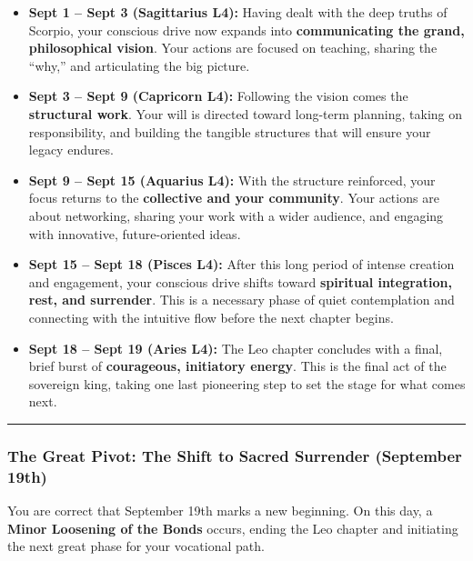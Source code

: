 \documentclass{article}
\begin{document}
\begin{itemize}
\item
  \textbf{Sept 1 -- Sept 3 (Sagittarius L4):} Having dealt with the deep truths of Scorpio, your conscious drive now expands into \textbf{communicating the grand, philosophical vision}. Your actions are focused on teaching, sharing the ``why,'' and articulating the big picture.
\item
  \textbf{Sept 3 -- Sept 9 (Capricorn L4):} Following the vision comes the \textbf{structural work}. Your will is directed toward long-term planning, taking on responsibility, and building the tangible structures that will ensure your legacy endures.
\item
  \textbf{Sept 9 -- Sept 15 (Aquarius L4):} With the structure reinforced, your focus returns to the \textbf{collective and your community}. Your actions are about networking, sharing your work with a wider audience, and engaging with innovative, future-oriented ideas.
\item
  \textbf{Sept 15 -- Sept 18 (Pisces L4):} After this long period of intense creation and engagement, your conscious drive shifts toward \textbf{spiritual integration, rest, and surrender}. This is a necessary phase of quiet contemplation and connecting with the intuitive flow before the next chapter begins.
\item
  \textbf{Sept 18 -- Sept 19 (Aries L4):} The Leo chapter concludes with a final, brief burst of \textbf{courageous, initiatory energy}. This is the final act of the sovereign king, taking one last pioneering step to set the stage for what comes next.
\end{itemize}

\begin{center}\rule{0.5\linewidth}{0.5pt}\end{center}

\subsubsection*{The Great Pivot: The Shift to Sacred Surrender (September 19th)}\label{the-great-pivot-the-shift-to-sacred-surrender-september-19th}

You are correct that September 19th marks a new beginning. On this day, a \textbf{Minor Loosening of the Bonds} occurs, ending the Leo chapter and initiating the next great phase for your vocational path.
\end{document}
